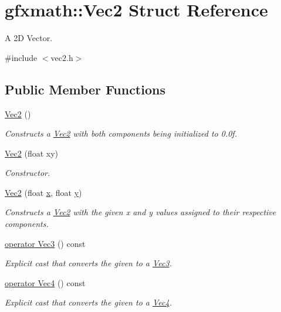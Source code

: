 \hypertarget{structgfxmath_1_1_vec2}{}\section{gfxmath\+:\+:Vec2 Struct Reference}
\label{structgfxmath_1_1_vec2}


A 2\+D Vector.  




{\ttfamily \#include $<$vec2.\+h$>$}

\subsection*{Public Member Functions}
\begin{DoxyCompactItemize}
\item 
\hyperlink{structgfxmath_1_1_vec2_a6705094ec1164c6a52c1bbe9d94d9192}{Vec2} ()
\begin{DoxyCompactList}\small\item\em Constructs a \hyperlink{structgfxmath_1_1_vec2}{Vec2} with both components being initialized to 0.\+0f. \end{DoxyCompactList}\item 
\hyperlink{structgfxmath_1_1_vec2_ae02f434b2c19a96b3a4de04ab40d1926}{Vec2} (float xy)
\begin{DoxyCompactList}\small\item\em Constructor. \end{DoxyCompactList}\item 
\hyperlink{structgfxmath_1_1_vec2_a5d6593c89cfc3f5f0d0d11335363a50b}{Vec2} (float \hyperlink{structgfxmath_1_1_vec2_ae822579debf2a7b9aab468fbb4ce218d}{x}, float \hyperlink{structgfxmath_1_1_vec2_acfad5fd06cb37b0e0e5373f286e7d474}{y})
\begin{DoxyCompactList}\small\item\em Constructs a \hyperlink{structgfxmath_1_1_vec2}{Vec2} with the given x and y values assigned to their respective components. \end{DoxyCompactList}\item 
\hyperlink{structgfxmath_1_1_vec2_aa781cb14c428b5fbd4d0ba9e9434d726}{operator Vec3} () const 
\begin{DoxyCompactList}\small\item\em Explicit cast that converts the given to a \hyperlink{structgfxmath_1_1_vec3}{Vec3}. \end{DoxyCompactList}\item 
\hyperlink{structgfxmath_1_1_vec2_a4321b08d9298859824ac1cfcf44ab166}{operator Vec4} () const 
\begin{DoxyCompactList}\small\item\em Explicit cast that converts the given to a \hyperlink{structgfxmath_1_1_vec4}{Vec4}. \end{DoxyCompactList}\end{DoxyCompactItemize}

